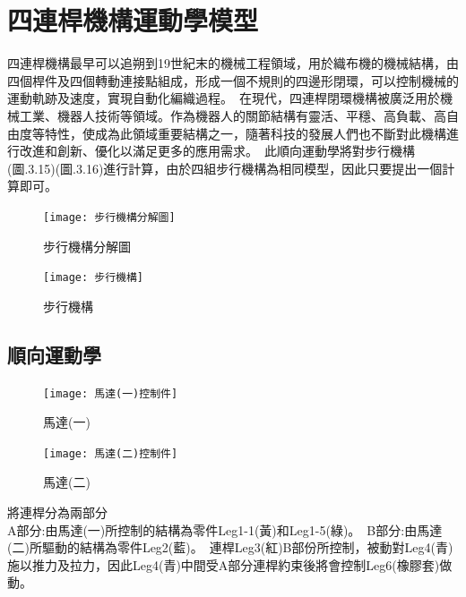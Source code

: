 \section{四連桿機構運動學模型}

四連桿機構最早可以追朔到19世紀末的機械工程領域，用於織布機的機械結構，由四個桿件及四個轉動連接點組成，形成一個不規則的四邊形閉環，可以控制機械的運動軌跡及速度，實現自動化編織過程。\
在現代，四連桿閉環機構被廣泛用於機械工業、機器人技術等領域。作為機器人的關節結構有靈活、平穩、高負載、高自由度等特性，使成為此領域重要結構之一，隨著科技的發展人們也不斷對此機構進行改進和創新、優化以滿足更多的應用需求。\
此順向運動學將對步行機構(圖.3.15)(圖.3.16)進行計算，由於四組步行機構為相同模型，因此只要提出一個計算即可。\\
\begin{figure}[htbp]
  \begin{minipage}[t]{0.45\linewidth}
    \centering
    \texttt{[image: 步行機構分解圖]}
    \caption{步行機構分解圖}
    \label{步行機構分解圖}
  \end{minipage}
  \hfill
  \begin{minipage}[t]{0.45\linewidth}
    \centering
    \texttt{[image: 步行機構]}
    \caption{步行機構}
    \label{步行機構}
  \end{minipage}
\end{figure}
\newpage

\subsection{順向運動學}
\begin{figure}[htbp]
  \begin{minipage}[t]{0.5\linewidth}
    \centering
    \texttt{[image: 馬達(一)控制件]}
    \caption{馬達(一)}
    \label{馬達(一)控制件}
  \end{minipage}
  \hfill
  \begin{minipage}[t]{0.5\linewidth}
    \centering
    \texttt{[image: 馬達(二)控制件]}
    \caption{馬達(二)}
    \label{馬達(二)控制件}
  \end{minipage}
\end{figure}

將連桿分為兩部分\\
A部分:由馬達(一)所控制的結構為零件Leg1-1(黃)和Leg1-5(綠)。\
B部分:由馬達(二)所驅動的結構為零件Leg2(藍)。\
連桿Leg3(紅)B部份所控制，被動對Leg4(青)施以推力及拉力，因此Leg4(青)中間受A部分連桿約束後將會控制Leg6(橡膠套)做動。\\


